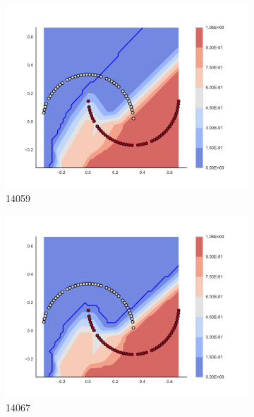 \begin{figure}[h]
\begin{subfigure}[b]{0.09\textwidth}
    \includegraphics[clip, trim=2.35cm 1.75cm 4.5cm 0cm,width=\textwidth]{img/convergence/14059.pdf}
    \caption{14059}
    \label{fig:convergence_14059}
\end{subfigure}
%
\begin{subfigure}[b]{0.09\textwidth}
    \includegraphics[clip, trim=2.35cm 1.75cm 4.5cm 0cm,width=\textwidth]{img/convergence/14067.pdf}
    \caption{14067}
    \label{fig:convergence_14067}
\end{subfigure}
%
\begin{subfigure}[b]{0.09\textwidth}

\end{subfigure}
\end{figure}
